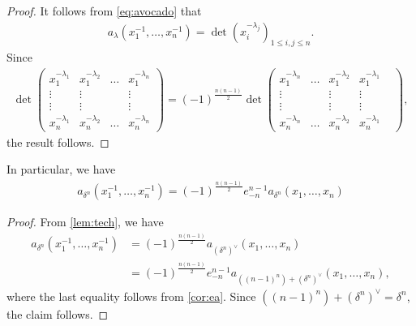 \documentclass[11pt]{amsart}
\begin{document}
     \begin{proof}
         It follows from \cref{eq:avocado} that
         \begin{align*}
             a_{\lambda}(x_1^{-1}, \dots, x_n^{-1}) = \det(x_i^{-\lambda_j})_{1\leq i,j\leq n}.
         \end{align*}
         Since
         \begin{align*}
        \det\begin{pmatrix}
            x_1^{-\lambda_1} & x_1^{-\lambda_2} & \dots & x_1^{-\lambda_n} \\
            \vdots & \vdots &   & \vdots\\
            \vdots & \vdots &   & \vdots\\
            x_n^{-\lambda_1} & x_n^{-\lambda_2}&\dots &x_n^{-\lambda_n}
             \end{pmatrix}  = (-1)^{\frac{n(n-1)}{2}}  \det\begin{pmatrix}
                 x_1^{-\lambda_n} &\dots & x_1^{-\lambda_2} & x_1^{-\lambda_1} &\\
                \vdots && \vdots   & \vdots\\
                \vdots && \vdots    & \vdots\\
                x_n^{-\lambda_n} &\dots& x_n^{-\lambda_2}&x_n^{-\lambda_1}
             \end{pmatrix},
        \end{align*}
         the result follows.   
    \end{proof}
    
     \begin{cor}
         In particular, we have 
         \begin{align}
             a_{\delta^n}(x_1^{-1},\dots, x_n^{-1}) = (-1)^{\frac{n(n-1)}{2}}e_{-n}^{n-1}a_{\delta^n}(x_1,\dots,x_n)
         \end{align}
     \end{cor}
     \begin{proof}
     From \cref{lem:tech}, we have
        \begin{align*}
            a_{\delta^n}(x_1^{-1},\dots, x_n^{-1}) &= (-1) ^{\frac{n(n-1)}{2}} a_{\left(\delta^n\right)^\vee}(x_1,\dots,x_n) \\
            & = (-1) ^{\frac{n(n-1)}{2}} e_{-n}^{n-1} a_{((n - 1)^n) + \left(\delta^n\right)^\vee}(x_1, \dots ,x_n),
        \end{align*} 
    where the last equality follows from \cref{cor:ea}. Since $((n-1)^n)  + \left(\delta^n\right)^\vee = \delta^n$, the claim follows.
     \end{proof}
    
\end{document}
